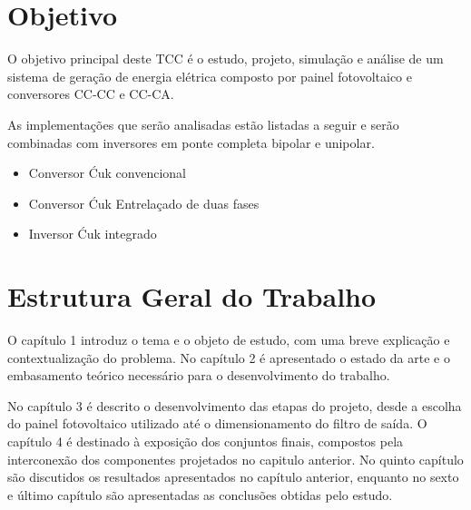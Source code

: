 \documentclass[
	12pt,				%
	openany,
	onseside,
	a4paper,			%
	english,			%
	french,				%
	spanish,			%
	brazil,				%
	]{abntex2}
\begin{document}
\section{Objetivo}

O objetivo principal deste TCC é o estudo, projeto, simulação e análise de um sistema de geração de energia elétrica composto por painel fotovoltaico e conversores CC-CC e CC-CA. 

As implementações que serão analisadas estão listadas a seguir e serão combinadas com inversores em ponte completa bipolar e unipolar.

\begin{itemize}
	
	\item Conversor Ćuk convencional
	\item Conversor Ćuk Entrelaçado de duas fases
	\item Inversor Ćuk integrado
	
\end{itemize}

\section{Estrutura Geral do Trabalho}

O capítulo 1 introduz o tema e o objeto de estudo, com uma breve explicação e contextualização do problema. No capítulo 2 é apresentado o estado da arte e o embasamento teórico necessário para o desenvolvimento do trabalho.

No capítulo 3 é descrito o desenvolvimento das etapas do projeto, desde a escolha do painel fotovoltaico utilizado até o dimensionamento do filtro de saída. O capítulo 4 é destinado à exposição dos conjuntos finais, compostos pela interconexão dos componentes projetados no capitulo anterior. No quinto capítulo são discutidos os resultados apresentados no capítulo anterior, enquanto no sexto e último capítulo são apresentadas as conclusões obtidas pelo estudo.
\end{document}
